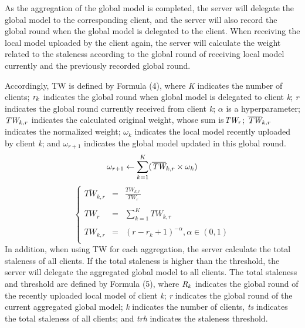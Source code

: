 \documentclass[twoside,twocolumn]{article}
\begin{document}
	As the aggregation of the global model is completed, the server will delegate the global model to the corresponding client, and the server will also record the global round when the global model is delegated to the client. When receiving the local model uploaded by the client again, the server will calculate the weight related to the staleness according to the global round of receiving local model currently and the previously recorded global round.

	Accordingly, TW is defined by Formula (4), where \emph{K} indicates the number of clients; $\emph{r}_k$ indicates the global round when global model is delegated to client \emph{k}; \emph{r} indicates the global round currently received from client \emph{k}; $\alpha$ is a hyperparameter; $\emph{TW}_{k,r}$ indicates the calculated original weight, whose sum is$\emph{TW}_r$; $\overline{\emph{TW}}_{k,r}$ indicates the normalized weight; $\omega_{k}$ indicates the local model recently uploaded by client \emph{k}; and $\omega_{r+1}$ indicates the global model updated in this global round.
\begin{equation}
\omega_{r+1} \leftarrow \sum_{k=1}^{K}(\overline{\emph{TW}}_{k,r} \times \omega_k)
\end{equation}
%
\begin{equation}
\left\{
\begin{array}{lll}
\overline{TW}_{k,r} & = & \frac{TW_{k,r}}{TW_{r}}\\
\\
TW_{r} & = & \sum_{k=1}^{K} TW_{k,r}\\
\\
TW_{k,r} & = & (r-r_{k}+1)^{-\alpha},\alpha \in (0,1)\\
\end{array}
\right.
\end{equation}
%
	In addition, when using TW for each aggregation, the server calculate the total staleness of all clients. If the total staleness is higher than the threshold, the server will delegate the aggregated global model to all clients. The total staleness and threshold are defined by Formula (5), where $\emph{R}_k$ indicates the global round of the recently uploaded local model of client \emph{k}; \emph{r} indicates the global round of the current aggregated global model; \emph{k} indicates the number of clients, \emph{ts} indicates the total staleness of all clients; and \emph{trh} indicates the staleness threshold.
\end{document}
